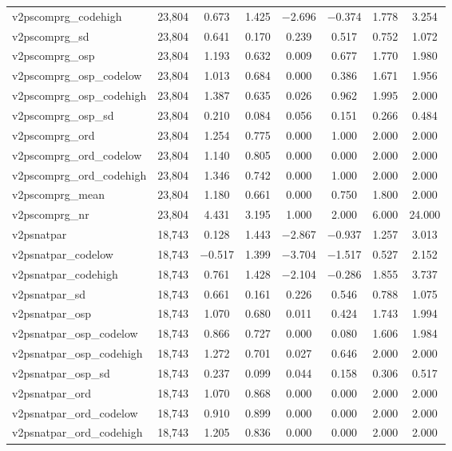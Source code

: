 \begin{table}[!htbp]
\begin{tabular}{@{\extracolsep{5pt}}lccccccc}
v2pscomprg\_codehigh & 23,804 & 0.673 & 1.425 & $-$2.696 & $-$0.374 & 1.778 & 3.254 \\ 
v2pscomprg\_sd & 23,804 & 0.641 & 0.170 & 0.239 & 0.517 & 0.752 & 1.072 \\ 
v2pscomprg\_osp & 23,804 & 1.193 & 0.632 & 0.009 & 0.677 & 1.770 & 1.980 \\ 
v2pscomprg\_osp\_codelow & 23,804 & 1.013 & 0.684 & 0.000 & 0.386 & 1.671 & 1.956 \\ 
v2pscomprg\_osp\_codehigh & 23,804 & 1.387 & 0.635 & 0.026 & 0.962 & 1.995 & 2.000 \\ 
v2pscomprg\_osp\_sd & 23,804 & 0.210 & 0.084 & 0.056 & 0.151 & 0.266 & 0.484 \\ 
v2pscomprg\_ord & 23,804 & 1.254 & 0.775 & 0.000 & 1.000 & 2.000 & 2.000 \\ 
v2pscomprg\_ord\_codelow & 23,804 & 1.140 & 0.805 & 0.000 & 0.000 & 2.000 & 2.000 \\ 
v2pscomprg\_ord\_codehigh & 23,804 & 1.346 & 0.742 & 0.000 & 1.000 & 2.000 & 2.000 \\ 
v2pscomprg\_mean & 23,804 & 1.180 & 0.661 & 0.000 & 0.750 & 1.800 & 2.000 \\ 
v2pscomprg\_nr & 23,804 & 4.431 & 3.195 & 1.000 & 2.000 & 6.000 & 24.000 \\ 
v2psnatpar & 18,743 & 0.128 & 1.443 & $-$2.867 & $-$0.937 & 1.257 & 3.013 \\ 
v2psnatpar\_codelow & 18,743 & $-$0.517 & 1.399 & $-$3.704 & $-$1.517 & 0.527 & 2.152 \\ 
v2psnatpar\_codehigh & 18,743 & 0.761 & 1.428 & $-$2.104 & $-$0.286 & 1.855 & 3.737 \\ 
v2psnatpar\_sd & 18,743 & 0.661 & 0.161 & 0.226 & 0.546 & 0.788 & 1.075 \\ 
v2psnatpar\_osp & 18,743 & 1.070 & 0.680 & 0.011 & 0.424 & 1.743 & 1.994 \\ 
v2psnatpar\_osp\_codelow & 18,743 & 0.866 & 0.727 & 0.000 & 0.080 & 1.606 & 1.984 \\ 
v2psnatpar\_osp\_codehigh & 18,743 & 1.272 & 0.701 & 0.027 & 0.646 & 2.000 & 2.000 \\ 
v2psnatpar\_osp\_sd & 18,743 & 0.237 & 0.099 & 0.044 & 0.158 & 0.306 & 0.517 \\ 
v2psnatpar\_ord & 18,743 & 1.070 & 0.868 & 0.000 & 0.000 & 2.000 & 2.000 \\ 
v2psnatpar\_ord\_codelow & 18,743 & 0.910 & 0.899 & 0.000 & 0.000 & 2.000 & 2.000 \\ 
v2psnatpar\_ord\_codehigh & 18,743 & 1.205 & 0.836 & 0.000 & 0.000 & 2.000 & 2.000 \\ 

\end{tabular}
\end{table}

